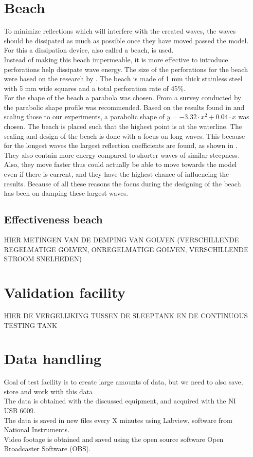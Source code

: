 \section{Beach}
\label{sec:beach}
To minimize reflections which will interfere with the created waves, the waves should be dissipated as much as possible once they have moved passed the model.
For this a dissipation device, also called a beach, is used. \\
Instead of making this beach impermeable, it is more effective to introduce perforations help dissipate wave energy. The size of the perforations for the beach were based on the research by \citet{Chegini1994}. The beach is made of 1 mm thick stainless steel with 5 mm wide squares and a total perforation rate of 45\%.  \\
For the shape of the beach a parabola was chosen. From a survey conducted by \citet{Ouellet1986} the parabolic shape profile was recommended. Based on the results found in \citet{Hodaei2016} and scaling those to our experiments, a parabolic shape of $y = -3.32 \cdot x^2 + 0.04\cdot x$ was chosen. The beach is placed such that the highest point is at the waterline. The scaling and design of the beach is done with a focus on long waves. This because for the longest waves the largest reflection coefficients are found, as shown in \cite{Suh2003}. They also contain more energy compared to shorter waves of similar steepness. Also, they move faster thus could actually be able to move towards the model even if there is current, and they have the highest chance of influencing the results. Because of all these reasons the focus during the designing of the beach has been on damping these largest waves.

\subsection{Effectiveness beach}
\label{sec:results_beach}
HIER METINGEN VAN DE DEMPING VAN GOLVEN (VERSCHILLENDE REGELMATIGE GOLVEN, ONREGELMATIGE GOLVEN, VERSCHILLENDE STROOM SNELHEDEN)

\section{Validation facility}
\label{sec:validation_facility}
HIER DE VERGELIJKING TUSSEN DE SLEEPTANK EN DE CONTINUOUS TESTING TANK

\section{Data handling}
\label{sec:data_handeling}
Goal of test facility is to create large amounts of data, but we need to also save, store and work with this data \\
The data is obtained with the discussed equipment, and acquired with the NI USB 6009. \\
The data is saved in new files every X minutes using Labview, software from National Instruments. \\
Video footage is obtained and saved using the open source software Open Broadcaster Software (OBS). 

